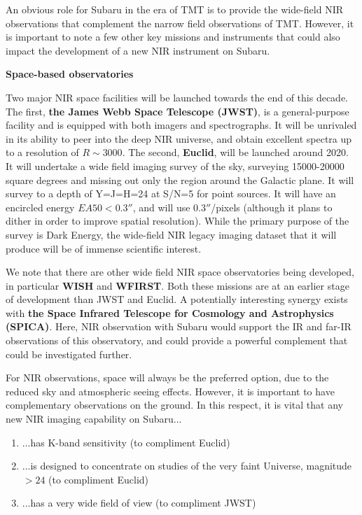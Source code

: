 An obvious role for Subaru in the era of TMT is to provide the
wide-field NIR observations that complement the narrow field
observations of TMT. However, it is important to note a few other key
missions and instruments that could also impact the development of a new
NIR instrument on Subaru. 

\medskip
\par\noindent
{\bf Space-based observatories}

Two major NIR space facilities will be launched towards the end of this
decade. The first, {\bf the James Webb Space Telescope (JWST)}, is a
general-purpose facility and is equipped with both imagers and
spectrographs. It will be unrivaled in its ability to peer into the deep
NIR universe, and obtain excellent spectra up to a resolution of
$R\sim3000$. The second, {\bf Euclid}, will be launched around 2020. It
will undertake a wide field imaging survey of the sky, surveying
15000-20000 square degrees and missing out only the region around the
Galactic plane. It will survey to a depth of Y=J=H=24 at S/N=5 for point
sources. It will have an encircled energy $EA50<0.3''$, and will use
$0.3''$/pixels (although it plans to dither in order to improve spatial
resolution). While the primary purpose of the survey is Dark Energy, the
wide-field NIR legacy imaging dataset that it will produce will be of
immense scientific interest. 

We note that there are other wide field NIR space observatories being
developed, in particular {\bf WISH} and {\bf WFIRST}. Both these
missions are at an earlier stage of development than JWST and Euclid. A
potentially interesting synergy exists with {\bf the Space Infrared
Telescope for Cosmology and Astrophysics (SPICA)}. Here, NIR observation
with Subaru would support the IR and far-IR observations of this
observatory, and could provide a powerful complement that could be
investigated further.  

For NIR observations, space will always be the preferred option, due to
the reduced sky and atmospheric seeing effects. However, it is important
to have complementary observations on the ground. In this respect, it is
vital that any new NIR imaging capability on Subaru... 

\begin{enumerate} 
\item ...has K-band sensitivity (to compliment Euclid)
\item ...is designed to concentrate on studies of the very faint
      Universe, magnitude $>24$ (to compliment Euclid)  
\item ...has a very wide field of view (to compliment JWST)
\end{enumerate}

